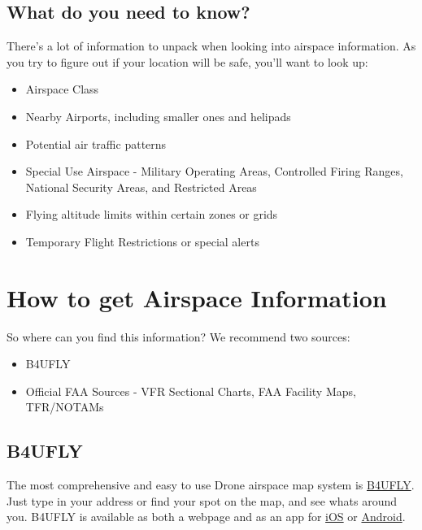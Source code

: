 \documentclass[
  12pt,
]{book}
\providecommand{\tightlist}{%
  \setlength{\itemsep}{0pt}\setlength{\parskip}{0pt}}
\begin{document}
\hypertarget{what-do-you-need-to-know}{%
\subsection{What do you need to know?}\label{what-do-you-need-to-know}}

There's a lot of information to unpack when looking into airspace information. As you try to figure out if your location will be safe, you'll want to look up:

\begin{itemize}
\tightlist
\item
  Airspace Class
\item
  Nearby Airports, including smaller ones and helipads
\item
  Potential air traffic patterns
\item
  Special Use Airspace - Military Operating Areas, Controlled Firing Ranges, National Security Areas, and Restricted Areas
\item
  Flying altitude limits within certain zones or grids
\item
  Temporary Flight Restrictions or special alerts
\end{itemize}

\hypertarget{how-to-get-airspace-information}{%
\section{How to get Airspace Information}\label{how-to-get-airspace-information}}

So where can you find this information? We recommend two sources:

\begin{itemize}
\tightlist
\item
  B4UFLY
\item
  Official FAA Sources - VFR Sectional Charts, FAA Facility Maps, TFR/NOTAMs
\end{itemize}

\hypertarget{b4ufly}{%
\subsection{B4UFLY}\label{b4ufly}}

The most comprehensive and easy to use Drone airspace map system is \href{https://b4ufly.aloft.ai/}{B4UFLY}. Just type in your address or find your spot on the map, and see whats around you. B4UFLY is available as both a webpage and as an app for \href{https://apps.apple.com/us/app/b4ufly/id992427109?ls=1}{iOS} or \href{https://play.google.com/store/apps/details?id=gov.faa.b4ufly2}{Android}.
\end{document}
